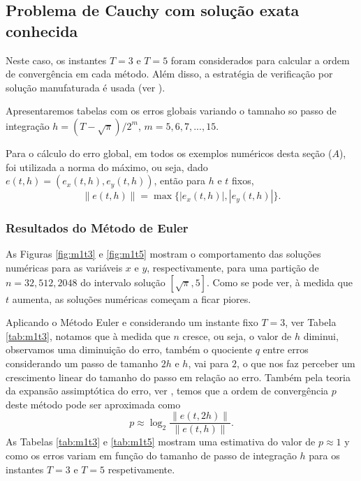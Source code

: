 \documentclass[twocolumn,amsmath,amssymb,floatfix]{revtex4}
\begin{document}
\subsection{Problema de Cauchy com solução exata conhecida}\label{sec:PVIConSol}
Neste caso, os instantes $T=3$ e $T=5$ foram considerados para calcular a ordem de convergência em cada método. Além disso, a estratégia de verificação por solução manufaturada é usada (ver \cite{livroProfAlexandre}).

Apresentaremos tabelas com os erros globais variando o tamnaho so passo de integração $h=(T-\sqrt{\pi})/2^m$, $m=5,6,7,...,15$.

Para o cálculo do erro global, em todos os exemplos numéricos desta seção ($A$), foi utilizada a norma do máximo, ou seja, dado $e(t,h)=(e_x(t,h),e_y(t,h))$, então para $h$ e $t$ fixos,
\begin{equation}
    \|e(t,h)\|=\max\{|e_x(t,h)|,|e_y(t,h)|\}.
\end{equation}

\subsubsection{Resultados do Método de Euler}
As Figuras \ref{fig:m1t3} e \ref{fig:m1t5} mostram o comportamento das soluções numéricas para as variáveis $x$ e $y$, respectivamente, para uma partição de $n=32,512,2048$ do intervalo solução $[\sqrt{\pi},5]$. Como se pode ver, à medida que $t$ aumenta, as soluções numéricas começam a ficar piores.

Aplicando o Método Euler e considerando um instante fixo $T=3$, ver Tabela \ref{tab:m1t3}, notamos que à medida que $n$ cresce, ou seja, o valor de $h$ diminui, observamos uma diminuição do erro, também o quociente $q$ entre erros considerando um passo de tamanho $2h$ e $h$, vai para $2$, o que nos faz perceber um crescimento linear do tamanho do passo em relação ao erro.
Também pela teoria da expansão assimptótica do erro, ver \cite{livroProfAlexandre}, temos que a ordem de convergência $p$ deste método pode ser aproximada como
\begin{equation}
    p\approx \log_2 \frac{\|e(t,2h)\|}{\|e(t,h)\|}.
\end{equation}
As Tabelas \ref{tab:m1t3} e \ref{tab:m1t5} mostram uma estimativa do valor de $p\approx 1$ y como os erros variam em função do tamanho de passo de integração $h$ para os instantes $T=3$ e $T=5$ respetivamente.
\end{document}
